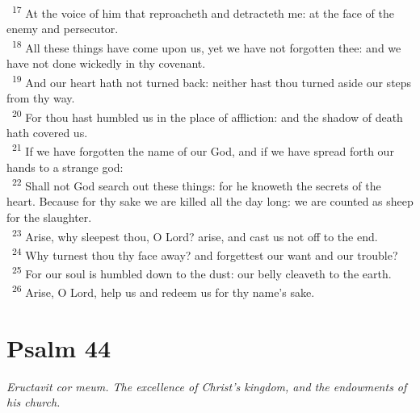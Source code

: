 \documentclass[a5paper,12pt]{article}
\begin{document}
\begin{multicols*}{2}
~\textsuperscript{17} At the voice of him that reproacheth and detracteth me: at the face of the enemy and persecutor.\\
~\textsuperscript{18} All these things have come upon us, yet we have not forgotten thee: and we have not done wickedly in thy covenant.\\
~\textsuperscript{19} And our heart hath not turned back: neither hast thou turned aside our steps from thy way.\\
~\textsuperscript{20} For thou hast humbled us in the place of affliction: and the shadow of death hath covered us.\\
~\textsuperscript{21} If we have forgotten the name of our God, and if we have spread forth our hands to a strange god:\\
~\textsuperscript{22} Shall not God search out these things: for he knoweth the secrets of the heart. Because for thy sake we are killed all the day long: we are counted as sheep for the slaughter.\\
~\textsuperscript{23} Arise, why sleepest thou, O Lord? arise, and cast us not off to the end.\\
~\textsuperscript{24} Why turnest thou thy face away? and forgettest our want and our trouble?\\
~\textsuperscript{25} For our soul is humbled down to the dust: our belly cleaveth to the earth.\\
~\textsuperscript{26} Arise, O Lord, help us and redeem us for thy name's sake.\\

\section{Psalm 44}
\label{sec:orge7d3bf7}
\emph{Eructavit cor meum. The excellence of Christ's kingdom, and the endowments of his church.}\\


\end{multicols*}
\end{document}
